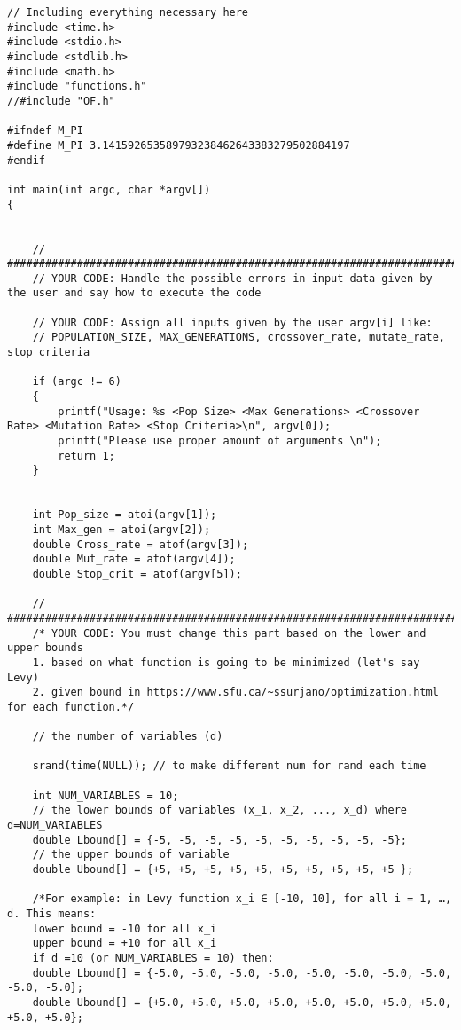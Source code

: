 \documentclass[12pt]{article}
\begin{document}

 \begin{lstlisting}
// Including everything necessary here
#include <time.h>
#include <stdio.h>
#include <stdlib.h>
#include <math.h>
#include "functions.h"
//#include "OF.h"

#ifndef M_PI
#define M_PI 3.141592653589793238462643383279502884197
#endif

int main(int argc, char *argv[])
{

    
    // ###################################################################################
    // YOUR CODE: Handle the possible errors in input data given by the user and say how to execute the code

    // YOUR CODE: Assign all inputs given by the user argv[i] like:
    // POPULATION_SIZE, MAX_GENERATIONS, crossover_rate, mutate_rate, stop_criteria

    if (argc != 6)
    {
        printf("Usage: %s <Pop Size> <Max Generations> <Crossover Rate> <Mutation Rate> <Stop Criteria>\n", argv[0]);
        printf("Please use proper amount of arguments \n");
        return 1;
    }


    int Pop_size = atoi(argv[1]);
    int Max_gen = atoi(argv[2]);
    double Cross_rate = atof(argv[3]);
    double Mut_rate = atof(argv[4]);
    double Stop_crit = atof(argv[5]);

    // ###################################################################################
    /* YOUR CODE: You must change this part based on the lower and upper bounds
    1. based on what function is going to be minimized (let's say Levy)
    2. given bound in https://www.sfu.ca/~ssurjano/optimization.html for each function.*/

    // the number of variables (d)

    srand(time(NULL)); // to make different num for rand each time

    int NUM_VARIABLES = 10;
    // the lower bounds of variables (x_1, x_2, ..., x_d) where d=NUM_VARIABLES
    double Lbound[] = {-5, -5, -5, -5, -5, -5, -5, -5, -5, -5};
    // the upper bounds of variable
    double Ubound[] = {+5, +5, +5, +5, +5, +5, +5, +5, +5, +5 };

    /*For example: in Levy function x_i ∈ [-10, 10], for all i = 1, …, d. This means:
    lower bound = -10 for all x_i
    upper bound = +10 for all x_i
    if d =10 (or NUM_VARIABLES = 10) then:
    double Lbound[] = {-5.0, -5.0, -5.0, -5.0, -5.0, -5.0, -5.0, -5.0, -5.0, -5.0};
    double Ubound[] = {+5.0, +5.0, +5.0, +5.0, +5.0, +5.0, +5.0, +5.0, +5.0, +5.0};


\end{lstlisting}
\end{document}
